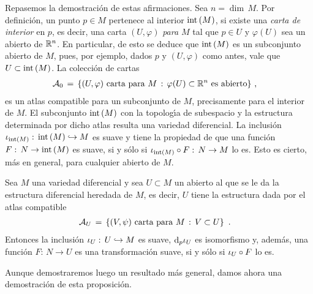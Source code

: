 Repasemos la demostraci\'{o}n de estas afirmaciones. Sea $n=\dim\,M$.
Por definici\'{o}n, un punto $p\in M$ pertenece al interior $\interior{M}$,
si existe una \emph{carta de interior} en $p$, es decir, una carta
$(U,\varphi)$ \emph{para $M$} tal que $p\in U$ y $\varphi(U)$ sea un
abierto de $\bb{R}^{n}$. En particular, de esto se deduce que $\interior{M}$
es un subconjunto abierto de $M$, pues, por ejemplo, dados $p$ y $(U,\varphi)$
como antes, vale que $U\subset\interior{M}$. La colecci\'{o}n de cartas
\begin{align*}
	\cal{A}_{0} & \,=\,\{(U,\varphi)\text{ carta para }M\,:\,
		\varphi(U)\subset\bb{R}^{n}\text{ es abierto}\}
	\text{ ,}
\end{align*}
%
es un atlas compatible para un subconjunto de $M$, precisamente para
el interior de $M$. El subconjunto $\interior{M}$ con la topolog\'{\i}a
de subespacio y la estructura determinada por dicho atlas resulta
una variedad diferencial. La inclusi\'{o}n
$\inc[\interior{M}]:\,\interior{M}\hookrightarrow M$ es suave y tiene
la propiedad de que una funci\'{o}n $F:\,N\rightarrow\interior{M}$ es suave,
si y s\'{o}lo si $\inc[\interior{M}]\circ F:\,N\rightarrow M$ lo es.
Esto es cierto, m\'{a}s en general, para cualquier abierto de $M$.

\begin{propoAbiertoEsSubvariedadRegular}\label{thm:abiertosubvarreg}
	Sea $M$ una variedad diferencial y sea $U\subset M$ un abierto al
	que se le da la estructura diferencial heredada de $M$, es decir,
	$U$ tiene la estructura dada por el atlas compatible
	\begin{align*}
		\cal{A}_{U} & \,=\,
		\left\lbrace (V,\psi)\text{ carta para } M\,:\,
			V\subset U\right\rbrace
		\text{ .}
	\end{align*}
	Entonces la inclusi\'{o}n $\inc[U]:\,U\hookrightarrow M$ es suave,
	$\diferencial[p]{\inc[U]}$ es isomorfismo y, adem\'{a}s, una
	funci\'{o}n $F:\,N\rightarrow U$ es una transformaci\'{o}n suave,
	si y s\'{o}lo si $\inc[U]\circ F$ lo es.
\end{propoAbiertoEsSubvariedadRegular}

Aunque demostraremos luego un resultado m\'{a}s general, damos ahora una
demostraci\'{o}n de esta proposici\'{o}n.

